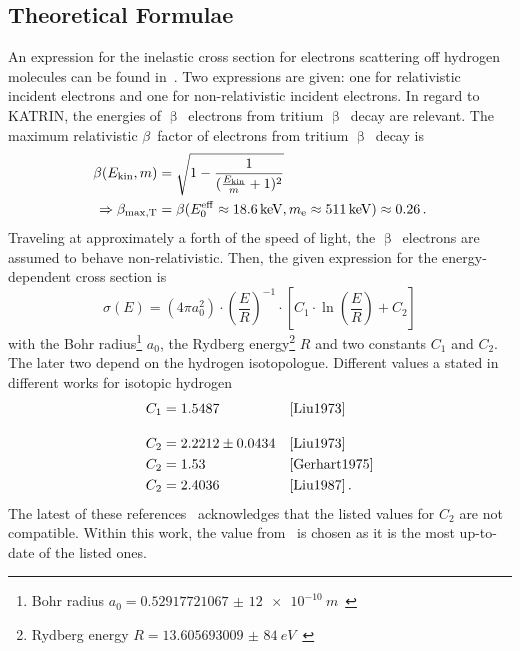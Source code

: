 \subsection{Theoretical Formulae}
\label{sec:eDepScatCrossSecSourcesTheory}
An expression for the inelastic cross section for electrons scattering off hydrogen molecules can be found in~\cite{Liu1973}. Two expressions are given: one for relativistic incident electrons and one for non-relativistic incident electrons. In regard to KATRIN, the energies of $\upbeta$~electrons from tritium $\upbeta$~decay are relevant. The maximum relativistic $\beta$~factor of electrons from tritium $\upbeta$~decay is
\begin{align}
\beta(E_\mathrm{kin}, m) &= 
\sqrt{
	1-\frac{1}{
		(\frac{E_\mathrm{kin}}{m}+1)^2
	}
} \label{eq:eDepScatCrossSecSourcesCrossSecBetaFactor} \\
\Rightarrow\beta_\mathrm{max, T} &= 
\beta(E_0^\mathrm{eff}\approx\SI{18.6}{keV}, m_{\mathrm{e}}\approx\SI{511}{keV})\approx0.26 
\text{\,.}
\end{align}
Traveling at approximately a forth of the speed of light, the $\upbeta$~electrons are assumed to behave non-relativistic. Then, the given expression for the energy-dependent cross section is~\cite{Liu1973}
\begin{equation}
\label{eq:eDepScatCrossSecSourcesCrossSecLiu}
\sigma(E) =  
(4 \pi a_0^2) \cdot
\left(\frac{E}{R}\right)^{-1} \cdot
\left[
C_1 \cdot \ln{\left(\frac{E}{R}\right)} + C_2
\right]
\end{equation}
with the Bohr radius\footnote{Bohr radius $a_0=\SI[separate-uncertainty=false]{0.529 177 210 67(12)e-10}{m}$~\cite{ReviewOfParticlePhysics}} $a_0$, 
the Rydberg energy\footnote{Rydberg energy $R=\SI[separate-uncertainty=false]{13.605 693 009(84)}{eV}$~\cite{ReviewOfParticlePhysics}} $R$ and two constants $C_1$ and $C_2$. The later two depend on the hydrogen isotopologue. Different values a stated in different works for isotopic hydrogen
\begin{subequations}
\label{eq:eDepScatCrossSecSourcesCrossSecLiuConstants}
\begin{align}
C_1 &= 1.5487 &&\text{\cite{Liu1973}}
\label{eq:eDepScatCrossSecSourcesCrossSecLiuConstantsC1}\\[10pt]
C_2 &= 2.2212\pm0.0434 &&\text{\cite{Liu1973}}
\label{eq:eDepScatCrossSecSourcesCrossSecLiuConstantsC2Uncert}\\
C_2 &= 1.53 &&\text{\cite{Gerhart1975}} \\
C_2 &= 2.4036 &&\text{\cite{Liu1987}}
\label{eq:eDepScatCrossSecSourcesCrossSecLiuConstantsC2}
\text{\,.}
\end{align}
\end{subequations}
The latest of these references~\cite{Liu1987} acknowledges that the listed values for $C_2$ are not compatible. Within this work, the value from~\cite{Liu1987} is chosen as it is the most up-to-date of the listed ones. 

